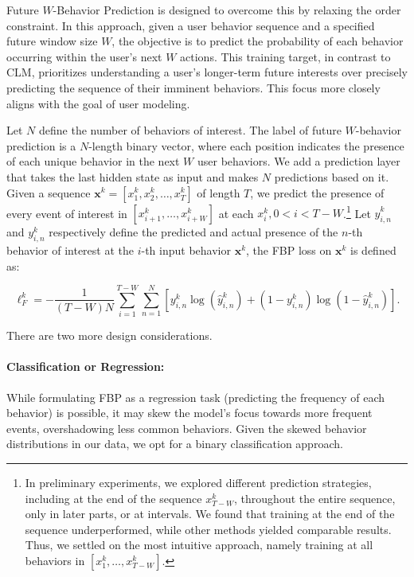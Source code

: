 \documentclass{article}
\begin{document}
Future $W$-Behavior Prediction is designed to overcome this by relaxing the order constraint. In this approach, given a user behavior sequence and a specified future window size $W$, the objective is to predict the probability of each behavior occurring within the user's next $W$ actions. This training target, in contrast to CLM, prioritizes understanding a user's longer-term future interests over precisely predicting the sequence of their imminent behaviors. This focus more closely aligns with the goal of user modeling.

Let $N$ define the number of behaviors of interest. The label of future $W$-behavior prediction is a $N$-length binary vector, where each position indicates the presence of each unique behavior in the next $W$ user behaviors. We add a prediction layer that takes the last hidden state as input and makes $N$ predictions based on it. 
Given a sequence $\bm{x}^k = [x_1^k,x_2^k,\ldots,x_T^k]$ of length $T$, we predict the presence of every event of interest in $[x_{i+1}^k,\ldots,x_{i+W}^k]$ at each $x_i^k, 0 < i < T-W$.\footnote{In preliminary experiments, we explored different prediction strategies, including at the end of the sequence $x_{T-W}^k$, throughout the entire sequence, only in later parts, or at intervals. We found that training at the end of the sequence underperformed, while other methods yielded comparable results. Thus, we settled on the most intuitive approach, namely training at all behaviors in $[x_1^k, \ldots, x_{T-W}^k]$.} Let $\hat{y}^k_{i,n}$ and $y^k_{i,n}$ respectively define the predicted and actual presence of the $n$-th behavior of interest at the $i$-th input behavior $\bm{x}^k$, the FBP loss on $\bm{x}^k$ is defined as:

\begin{equation}
\ell_F^k = -\frac{1}{(T-W) N} \sum_{i=1}^{T-W} \sum_{n=1}^N [{y}^k_{i,n} \log (\hat{y}^k_{i,n}) + (1-{y}^k_{i,n}) \log (1-\hat{y}^k_{i,n})]. 
\end{equation}

There are two more design considerations. 

    \paragraph{Classification or Regression:} While formulating FBP as a regression task (predicting the frequency of each behavior) is possible, it may skew the model's focus towards more frequent events, overshadowing less common behaviors. Given the skewed behavior distributions in our data, we opt for a binary classification approach.
    
\end{document}
